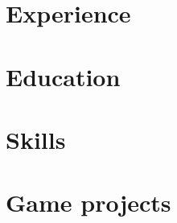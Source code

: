 \def\sitepage{game-experiments}
\section{Experience}





\section{Education}







\clearpage




\section{Skills}
\begin{cvcolumns}
  
  
  
\end{cvcolumns}




\section{Game projects}


